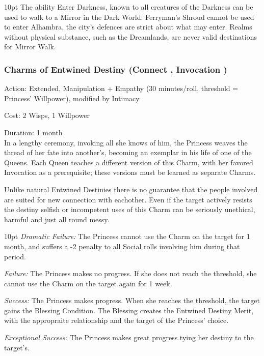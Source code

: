 \begin{myindentpar}{10pt}
The ability Enter Darkness, known to all creatures of the Darkness can be used to walk to a Mirror in the Dark World. Ferryman's Shroud cannot be used to enter Alhambra, the city's defences are strict about what may enter. Realms without physical substance, such as the Dreamlands, are never valid destinations for Mirror Walk.

\end{myindentpar}

\subsubsection*{Charms of Entwined Destiny (Connect \textbullet\textbullet\textbullet\textbullet, Invocation \textbullet\textbullet\textbullet)}

\noindent Action: Extended, Manipulation + Empathy (30 minutes/roll, threshold = Princess' Willpower), modified by Intimacy

\noindent Cost: 2 Wisps, 1 Willpower

\noindent Duration: 1 month \\

\noindent In a lengthy ceremony, invoking all she knows of him, the Princess weaves the thread of her fate into another's, becoming an exemplar in his life of one of the Queens. Each Queen teaches a different version of this Charm, with her favored Invocation as a prerequisite; these versions must be learned as separate Charms.

Unlike natural Entwined Destinies there is no guarantee that the people involved are suited for new connection with eachother. Even if the target actively resists the destiny selfish or incompetent uses of this Charm can be seriously unethical, harmful and just all round messy. 

       \begin{myindentpar}{10pt}  \emph{Dramatic Failure:} The Princess cannot use the Charm on the target for 1 month, and suffers a -2 penalty to all Social rolls involving him during that period.

        \emph{Failure:} The Princess makes no progress. If she does not reach the threshold, she cannot use the Charm on the target again for 1 week.

        \emph{Success:} The Princess makes progress. When she reaches the threshold, the target gains the Blessing Condition. The Blessing creates the Entwined Destiny Merit, with the appropraite relationship and the target of the Princess' choice. 

        \emph{Exceptional Success:} The Princess makes great progress tying her destiny to the target's.\end{myindentpar}

